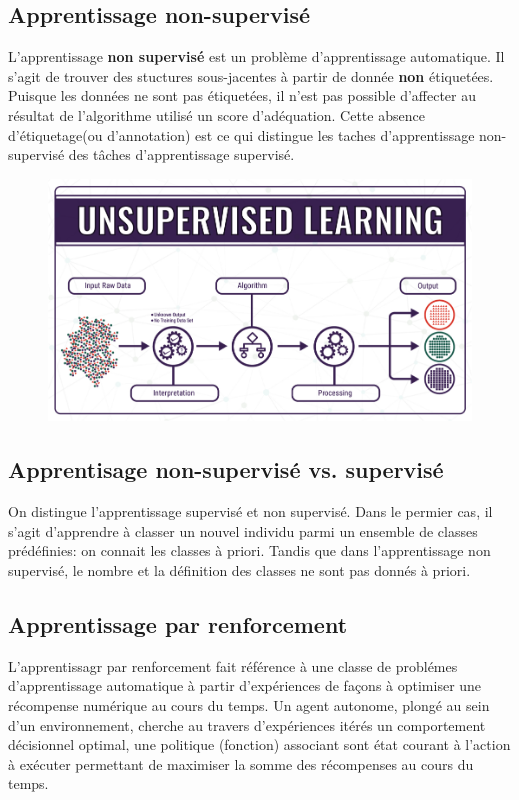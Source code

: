 \subsection{Apprentissage non-supervisé}
L'apprentissage \textbf{non supervisé} est un problème d'apprentissage automatique. Il s'agit de trouver des stuctures sous-jacentes à partir de donnée \textbf{non} étiquetées. Puisque les données ne sont pas étiquetées, il n'est pas possible d'affecter  au résultat de l'algorithme utilisé un score d'adéquation. Cette absence d'étiquetage(ou d'annotation) est ce qui distingue les taches d'apprentissage non-supervisé des tâches d'apprentissage supervisé.
\begin{figure}[H]
    \centering
    \includegraphics[scale = 0.5]{Question1/unsupervised-learning.png}
    \caption{}
    \label{fig:my_label}
\end{figure}

\subsection{Apprentisage non-supervisé vs. supervisé}
On distingue l'apprentissage supervisé et non supervisé. Dans le permier cas, il s'agit d'apprendre à classer un nouvel individu parmi un ensemble de classes prédéfinies: on connait les classes à priori. Tandis que dans l'apprentissage non supervisé, le nombre et la définition des classes ne sont pas donnés à priori.

\subsection{Apprentissage par renforcement}
L'apprentissagr par renforcement fait référence à une classe de problémes d'apprentissage automatique à partir d'expériences de façons à optimiser une récompense numérique au cours du temps. Un agent autonome, plongé au sein d'un environnement, cherche au travers d'expériences itérés un comportement décisionnel optimal, une politique (fonction) associant sont état courant à l'action à exécuter permettant de maximiser la somme des récompenses au cours du temps.

